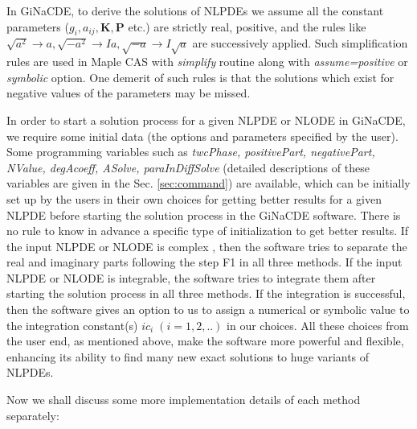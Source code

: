 \documentclass[prd,aps,floats,showkeys,nofootinbib,notitlepage]{revtex4-2}
\begin{document}
	In GiNaCDE, to derive the solutions of NLPDEs we assume all the constant parameters ($g_i,a_{ij},\boldsymbol{K},\boldsymbol{P}$ etc.) are strictly real, positive, and the rules like $\sqrt{a^2}\rightarrow a,\sqrt{-a^2}\rightarrow Ia, \sqrt{-a}\rightarrow I\sqrt{a}$ are successively applied. Such simplification rules are used in {Maple} CAS with {\em simplify} routine along with {\em assume=positive} or {\em symbolic} option. One demerit of such rules is that the solutions which exist for negative values of the parameters may be missed. 
	
	In order to start a solution process for a given NLPDE or NLODE in GiNaCDE, we require some initial data (the options and parameters specified by the user). Some programming variables such as \textit{twcPhase, positivePart, negativePart, NValue,  degAcoeff, ASolve, paraInDiffSolve} (detailed descriptions of these variables are given in the Sec. \ref{sec:command}) are available, which can be initially set up by the users in their own choices for getting better results for a given NLPDE before starting the solution process in the GiNaCDE software. There is no rule to know in advance a specific type of initialization to get better results.
	If the input NLPDE or NLODE is complex , then the software tries to separate the real and imaginary parts following the step F1 in all three methods.
	If the input NLPDE or NLODE is integrable, the software tries to integrate them after starting the solution process in all three methods. If the integration is successful, then the software gives an option to us to assign a numerical or symbolic value to the integration constant(s) $ic_i\;(i=1,2,..)$ in our choices. All these choices from the user end, as mentioned above, make the software more powerful and flexible, enhancing its ability to find many new exact solutions to huge variants of NLPDEs.
	
	Now we shall discuss some more implementation details of each method separately:
	
\end{document}
